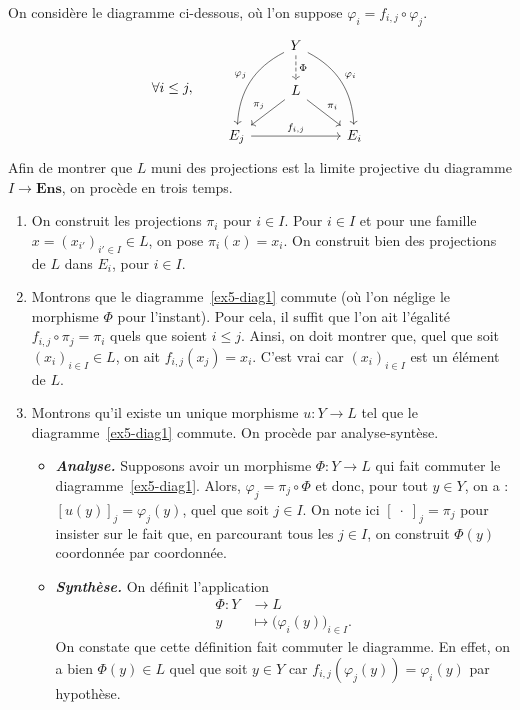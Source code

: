 \documentclass{../../td}
\begin{document}
  On considère le diagramme ci-dessous, où l'on suppose $\varphi_i = f_{i,j}\circ \varphi_j$.
  \begin{equation}
    \forall i\le j, \quad\quad
    \begin{tikzcd}
      & Y \arrow[dashed]{d}{\Phi} \arrow[bend right,swap]{ddl}{\varphi_j} \arrow[bend left]{ddr}{\varphi_i}\\
      & L \arrow[swap]{dl}{\pi_j} \arrow{dr}{\pi_i}\\
      E_j \arrow{rr}{f_{i,j}} & & E_i
    \end{tikzcd}
    \label{ex5-diag1}
  \end{equation}
  Afin de montrer que $L$ muni des projections est la limite projective du diagramme $I \to \mathbf{Ens}$, on procède en trois temps.
  \begin{enumerate}
    \item On construit les projections $\pi_i$ pour $i \in I$.
      Pour $i \in I$ et pour une famille $x = (x_{i'})_{i' \in I} \in L$, on pose $\pi_i(x) = x_i$.
      On construit bien des projections de $L$ dans $E_i$, pour $i \in I$.

    \item Montrons que le diagramme~\ref{ex5-diag1} commute (où l'on néglige le morphisme $\Phi$ pour l'instant).
      Pour cela, il suffit que l'on ait l'égalité $f_{i,j} \circ \pi_j = \pi_i$ quels que soient $i \le j$.
      Ainsi, on doit montrer que, quel que soit $(x_i)_{i \in I} \in L$, on ait $f_{i,j}(x_j) = x_i$.
      C'est vrai car $(x_i)_{i \in I}$ est un élément de $L$.
    \item Montrons qu'il existe un unique morphisme $u : Y \to L$ tel que le diagramme~\ref{ex5-diag1} commute.
      On procède par analyse-syntèse.
      \begin{itemize}
        \item \textbf{\textsl{\color{deepblue}Analyse.}}
          Supposons avoir un morphisme $\Phi : Y \to L$ qui fait commuter le diagramme~\ref{ex5-diag1}.
          Alors, $\varphi_j = \pi_j \circ \Phi$ et donc, pour tout $y \in Y$, on a : $[u(y)]_j = \varphi_j(y)$, quel que soit $j \in I$.
          On note ici $[\;\cdot\;]_j = \pi_j$ pour insister sur le fait que, en parcourant tous les $j \in I$, on construit $\Phi(y)$ coordonnée par coordonnée.
        \item \textbf{\textsl{\color{deepblue}Synthèse.}}
          On définit l'application
          \begin{align*}
            \Phi: Y &\longrightarrow L \\
            y &\longmapsto \big(\varphi_i(y)\big)_{i \in I}
          .\end{align*}
          On constate que cette définition fait commuter le diagramme.
          En effet, on a bien $\Phi(y) \in L$ quel que soit $y \in Y$ car $f_{i,j}(\varphi_j(y)) = \varphi_i(y)$ par hypothèse.
      \end{itemize}
  \end{enumerate}
\end{document}
